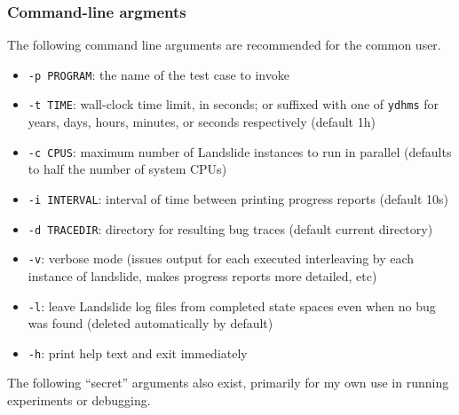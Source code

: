 \subsubsection{Command-line argments}

The following command line arguments are recommended for the common user.

\begin{itemize}
	\item {\tt -p PROGRAM}: the name of the test case to invoke
	\item {\tt -t TIME}: wall-clock time limit, in seconds; or suffixed with one of {\tt ydhms} for years, days, hours, minutes, or seconds respectively (default 1h)
	\item {\tt -c CPUS}: maximum number of Landslide instances to run in parallel (defaults to half the number of system CPUs)
	\item {\tt -i INTERVAL}: interval of time between printing progress reports (default 10s)
	\item {\tt -d TRACEDIR}: directory for resulting bug traces (default current directory)
	\item {\tt -v}: verbose mode (issues output for each executed interleaving by each instance of landslide, makes progress reports more detailed, etc)
	\item {\tt -l}: leave Landslide log files from completed state spaces even when no bug was found (deleted automatically by default)
	\item {\tt -h}: print help text and exit immediately
\end{itemize}

The following ``secret'' arguments also exist, primarily for my own use in running experiments or debugging.

